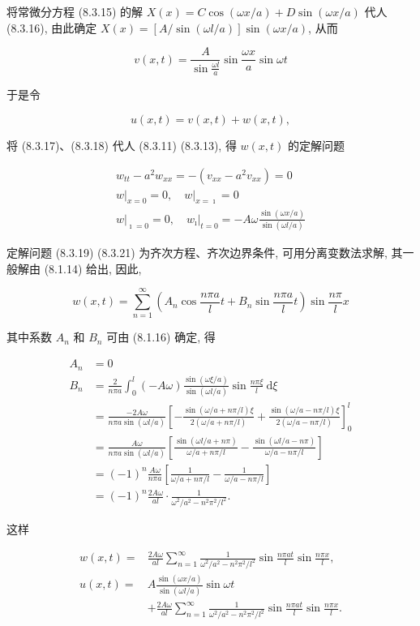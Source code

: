 将常微分方程 (8.3.15) 的解 $X(x)=C \cos (\omega x / a)+D \sin (\omega x / a)$ 代人 (8.3.16), 由此确定 $X(x)=[A / \sin (\omega l / a)] \sin (\omega x / a)$, 从而

$$
v(x, t)=\frac{A}{\sin \frac{\omega l}{a}} \sin \frac{\omega x}{a} \sin \omega t
$$

于是令

$$
u(x, t)=v(x, t)+w(x, t),
$$

将 (8.3.17)、(8.3.18) 代人 (8.3.11) (8.3.13), 得 $w(x, t)$ 的定解问题

$$
\begin{gathered}
w_{t t}-a^{2} w_{x x}=-\left(v_{x x}-a^{2} v_{x x}\right)=0 \\
\left.w\right|_{x=0}=0,\left.\quad w\right|_{x=\imath}=0 \\
\left.w\right|_{\imath=0}=0,\left.\quad w_{\imath}\right|_{t=0}=-A \omega \frac{\sin (\omega x / a)}{\sin (\omega l / a)}
\end{gathered}
$$

定解问题 (8.3.19) (8.3.21) 为齐次方程、齐次边界条件, 可用分离变数法求解, 其一般解由 (8.1.14) 给出, 因此,

$$
w(x, t)=\sum_{n=1}^{\infty}\left(A_{n} \cos \frac{n \pi a}{l} t+B_{n} \sin \frac{n \pi a}{l} t\right) \sin \frac{n \pi}{l} x
$$

其中系数 $A_{n}$ 和 $B_{n}$ 可由 (8.1.16) 确定, 得

$$
\begin{aligned}
A_{n} & =0 \\
B_{n} & =\frac{2}{n \pi a} \int_{0}^{l}(-A \omega) \frac{\sin (\omega \xi / a)}{\sin (\omega l / a)} \sin \frac{n \pi \xi}{l} \mathrm{~d} \xi \\
& =\frac{-2 A \omega}{n \pi a \sin (\omega l / a)}\left[-\frac{\sin (\omega / a+n \pi / l) \xi}{2(\omega / a+n \pi / l)}+\frac{\sin (\omega / a-n \pi / l) \xi}{2(\omega / a-n \pi / l)}\right]_{0}^{l} \\
& =\frac{A \omega}{n \pi a \sin (\omega l / a)}\left[\frac{\sin (\omega l / a+n \pi)}{\omega / a+n \pi / l}-\frac{\sin (\omega l / a-n \pi)}{\omega / a-n \pi / l}\right] \\
& =(-1)^{n} \frac{A \omega}{n \pi a}\left[\frac{1}{\omega / a+n \pi / l}-\frac{1}{\omega / a-n \pi / l}\right] \\
& =(-1)^{n} \frac{2 A \omega}{a l} \cdot \frac{1}{\omega^{2} / a^{2}-n^{2} \pi^{2} / l^{2}} .
\end{aligned}
$$

这样

$$
\begin{aligned}
w(x, t)= & \frac{2 A \omega}{a l} \sum_{n=1}^{\infty} \frac{1}{\omega^{2} / a^{2}-n^{2} \pi^{2} / l^{2}} \sin \frac{n \pi a t}{l} \sin \frac{n \pi x}{l}, \\
u(x, t)= & A \frac{\sin (\omega x / a)}{\sin (\omega l / a)} \sin \omega t \\
& +\frac{2 A \omega}{a l} \sum_{n=1}^{\infty} \frac{1}{\omega^{2} / a^{2}-n^{2} \pi^{2} / l^{2}} \sin \frac{n \pi a t}{l} \sin \frac{n \pi x}{l} .
\end{aligned}
$$